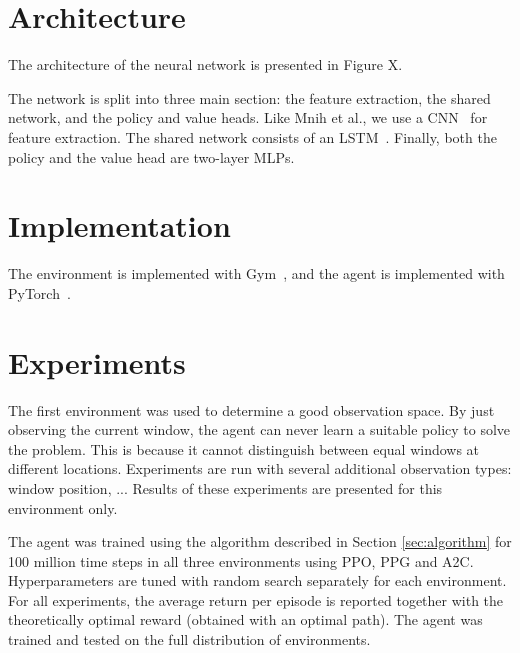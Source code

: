 \section{Architecture}



The architecture of the neural network is presented in Figure X.

The network is split into three main section: the feature extraction, the shared network, and the policy and value heads.
Like Mnih et al., we use a CNN~\cite{} for feature extraction.
The shared network consists of an LSTM~\cite{hochreiter}.
Finally, both the policy and the value head are two-layer MLPs.




\section{Implementation}

The environment is implemented with Gym~\cite{gym}, and the agent is implemented with PyTorch~\cite{pytorch}. 


\section{Experiments}

The first environment was used to determine a good observation space.
By just observing the current window, the agent can never learn a suitable policy to solve the problem.
This is because it cannot distinguish between equal windows at different locations.
Experiments are run with several additional observation types: window position, ...
Results of these experiments are presented for this environment only.

The agent was trained using the algorithm described in Section \ref{sec:algorithm} for 100 million time steps in all three environments using PPO, PPG and A2C.
Hyperparameters are tuned with random search separately for each environment.
For all experiments, the average return per episode is reported together with the theoretically optimal reward (obtained with an optimal path).
The agent was trained and tested on the full distribution of environments.

